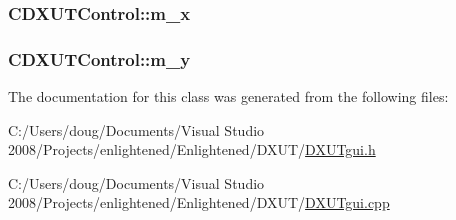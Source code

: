 \label{class_c_d_x_u_t_control_a273b313694fbe608f1e892402eb26357}
\hypertarget{class_c_d_x_u_t_control_a7ff012a10429df693525a53638b5b71a}{
\subsubsection[{m\_\-x}]{ {\bf CDXUTControl::m\_\-x}}}
\label{class_c_d_x_u_t_control_a7ff012a10429df693525a53638b5b71a}
\hypertarget{class_c_d_x_u_t_control_a88a4c4b4337437eec5071bb36c789f07}{
\subsubsection[{m\_\-y}]{ {\bf CDXUTControl::m\_\-y}}}
\label{class_c_d_x_u_t_control_a88a4c4b4337437eec5071bb36c789f07}


The documentation for this class was generated from the following files:\begin{DoxyCompactItemize}
\item 
C:/Users/doug/Documents/Visual Studio 2008/Projects/enlightened/Enlightened/DXUT/\hyperlink{_d_x_u_tgui_8h}{DXUTgui.h}\item 
C:/Users/doug/Documents/Visual Studio 2008/Projects/enlightened/Enlightened/DXUT/\hyperlink{_d_x_u_tgui_8cpp}{DXUTgui.cpp}\end{DoxyCompactItemize}
